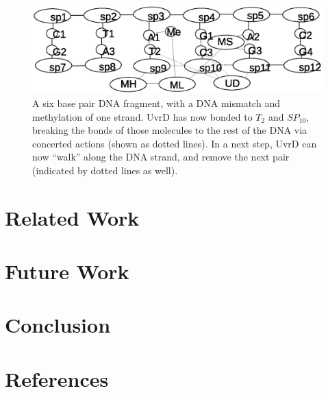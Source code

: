 \documentclass[review]{elsarticle}
\begin{document}
\begin{figure}[h!]
  \centering
    \includegraphics[width=1.0\textwidth]{mmr/state3}
  \caption[A six base pair DNA fragment.]{A six base pair DNA fragment, with a DNA mismatch and methylation of one strand. UvrD has now bonded to $T_2$ and $SP_{10}$, breaking the bonds of those molecules to the rest of the DNA via concerted actions (shown as dotted lines). In a next step, UvrD can now ``walk'' along the DNA strand, and remove the next pair (indicated by dotted lines as well).}
  \label{fig:state3}
\end{figure}

\section{Related Work}

\section{Future Work}

\section{Conclusion}

\section*{References}


\end{document}
